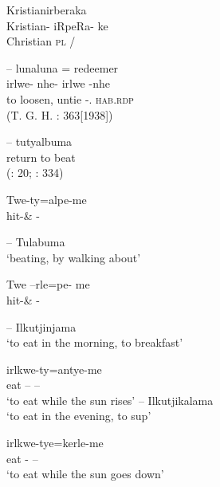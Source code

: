 \documentclass{langscibook}
\begin{document}
\begin{xlist}
\begin{xlist}
\begin{xlist}
\ea
Kristianirberaka\\
\gll Kristian-   iRpeRa-   ke\\
Christian   \textsc{pl}             /\\
\z






--
\ea            lunaluna = redeemer \\
\gll             irlwe- nhe- irlwe -nhe\\
           to{ }loosen,{ }untie -. \textsc{hab}.\textsc{rdp}\\
\glt (T. G. H. \citet{strehlow_aranda_1944}: 363[1938])
\z{}




--
\ea
   \label{bkm:Ref340586104}tutyalbuma\\
return to beat\\

(\citealt{kempe_grammar_1891}: 20; \citealt{mathews_languages_1907}: 334)

\gll Twe-ty=alpe-me\\
hit-\& -\\
\z


--
\ea
            \label{bkm:Ref340586632}Tulabuma\\
\glt `beating, by walking about'

\citep[19]{kempe_grammar_1891}

 \gll Twe –rle=pe- me\\
                    hit-\& -\\
\z


--
\ea
\label{bkm:Ref340587267}Ilkutjinjama\\
\glt `to eat in the morning, to breakfast'

\citep[20]{kempe_grammar_1891}

\gll irlkwe-ty=antye-me\\
eat –   – \\

\glt `to eat while the sun rises'
\z{}
--
\ea
\label{bkm:Ref340587421}Ilkutjikalama\\
\glt `to eat in the evening, to sup'

\citep[20]{kempe_grammar_1891}

\gll irlkwe-tye=kerle-me\\
eat -   – \\
\glt `to eat while the sun goes down'
\z{}


\end{xlist}
\end{xlist}
\end{xlist}
\end{document}
